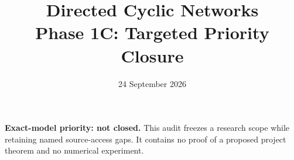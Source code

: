 \documentclass[11pt]{article}
\title{Directed Cyclic Networks\\Phase 1C: Targeted Priority Closure}
\author{}
\date{24 September 2026}
\begin{document}
\maketitle
\noindent\textbf{Exact-model priority: not closed.}
This audit freezes a research scope while retaining named source-access gaps.
It contains no proof of a proposed project theorem and no numerical experiment.
\tableofcontents
\clearpage

\clearpage


\end{document}

